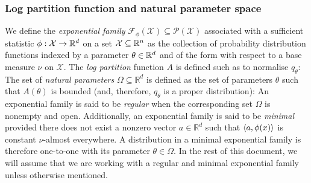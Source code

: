 

\subsubsection*{Log partition function and natural parameter space
}
We define the \emph{exponential family} $\mathcal F_\phi(\mathcal X)\subseteq\mathcal P(\mathcal X)$ associated with a sufficient statistic $\phi:\mathcal X\to\mathbb R^{d}$ on a set $\mathcal X\subseteq \mathbb R^{n}$ as the collection of probability distribution functions indexed by a parameter $\theta\in\mathbb R^{d}$ and of the form
%
%
with respect to a base measure $\nu$ on $\mathcal X$. The \emph{log partition} function $A$ is defined such as to normalise $q_{\theta}$:
%
%
The set of \emph{natural parameters} $\Omega \subseteq \mathbb R^{d}$ is defined as the set of parameters $\theta$ such that $A(\theta)$ is bounded (and, therefore, $q_\theta$ is a proper distribution):
%
An exponential family is said to be \emph{regular} when the corresponding set $\Omega$ is nonempty and open. Additionally, an exponential family is said to be \emph{minimal} provided there does not exist a nonzero vector $a\in\mathbb R^{d}$ such that $\left\langle a,\phi(x) \right\rangle$ is constant $\nu$-almost everywhere. A distribution in a minimal exponential family is therefore one-to-one with its parameter $\theta\in\Omega$. In the rest of this document, we will assume that we are working with a regular and minimal exponential family unless otherwise mentioned.

